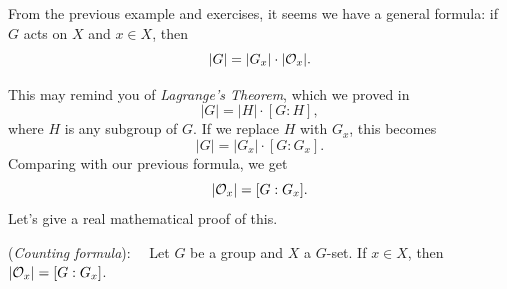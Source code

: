 From the previous example and exercises, it seems we have a general formula:  if $G$ acts on $X$ and $x\in X$, then 
$$|G|=|G_x|\cdot|{\cal O}_x|.$$

This may remind you of \emph{Lagrange's Theorem}, which we proved in %
$$|G|=|H|\cdot [G:H], $$
where $H$ is any subgroup of $G$.  If we replace $H$ with $G_x$, this becomes $$|G|=|G_x|\cdot [G:G_x]. $$
Comparing with our previous formula, we get
 $$|{\cal O}_x|=[G:G_x].$$
Let's give a real mathematical proof of this.

\begin{thm}\label{prop:CountingFormula}(\emph{Counting formula}):~~
Let $G$ be a group and $X$ a $G$-set. If $x\in X$,
then $|{\cal O}_x| = [G:G_x]$. 
\end{thm}

